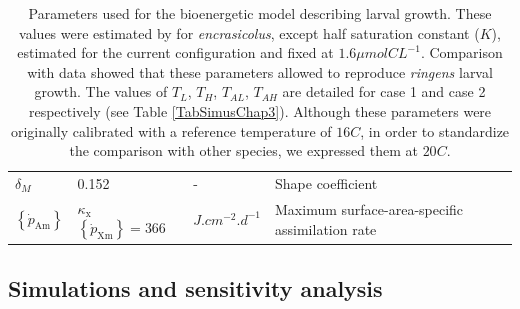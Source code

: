 \begin{table}[H]
\begin{adjustbox}{width=1.0\textwidth}
\begin{tabular}{l|l|l|l}
$\delta_{M}$
	& 0.152
	& -
	& Shape coefficient                               \\
$\left \{ \dot{p}_\mathrm{Am} \right \}$
	& $\kappa_{\mathrm{x}} $ $\left \{ \dot{p}_\mathrm{Xm} \right \}=366$
	& $J.cm^{-2}.d^{-1}$
	& Maximum surface-area-specific assimilation rate\\
\hline
\end{tabular}
\end{adjustbox}
\caption{Parameters used for the bioenergetic model describing larval growth. These values were estimated by \cite{PethRoos2013} for \textit{\gls{encrasicolus}}, except half saturation constant ($K$), estimated for the current configuration and fixed at $1.6 \mu mol CL^{-1}$. Comparison with data showed that these parameters allowed to reproduce \textit{\gls{ringens}} larval growth. The values of $T_{L}$, $T_{H}$, $T_{AL}$, $T_{AH}$ are detailed for case 1 and case 2 respectively (see Table \ref{TabSimusChap3}). Although these parameters were originally calibrated with a reference temperature of $16$\textdegree $C$, in order to standardize the comparison with other species, we expressed them at $20$\textdegree $C$.}
\label{TabDEBparEncra}
\end{table}

\subsection{Simulations and sensitivity analysis}


